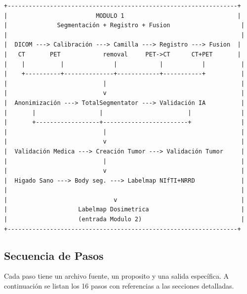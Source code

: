 \documentclass[12pt,a4paper]{article}
\begin{document}
\begin{lstlisting}
+-----------------------------------------------------------------+
|                         MODULO 1                                |
|              Segmentación + Registro + Fusion                    |
|                                                                  |
|  DICOM ---> Calibración ---> Camilla ---> Registro ---> Fusion  |
|   CT       PET            removal     PET->CT      CT+PET       |
|    |          |              |            |           |          |
|    +----------+--------------+------------+-----------+          |
|                           |                                      |
|                           v                                      |
|  Anonimización ---> TotalSegmentator ---> Validación IA          |
|       |                  |                        |              |
|       +------------------+------------------------+              |
|                           |                                      |
|                           v                                      |
|  Validación Medica ---> Creación Tumor ---> Validación Tumor     |
|                           |                                      |
|                           v                                      |
|  Higado Sano ---> Body seg. ---> Labelmap NIfTI+NRRD             |
|                                                                  |
|                              v                                   |
|                    Labelmap Dosimetrica                          |
|                    (entrada Modulo 2)                            |
+-----------------------------------------------------------------+
\end{lstlisting}

\subsection{Secuencia de Pasos}

Cada paso tiene un archivo fuente, un proposito y una salida específica.
A continuación se listan los 16 pasos con referencias a las secciones detalladas.
\end{document}
